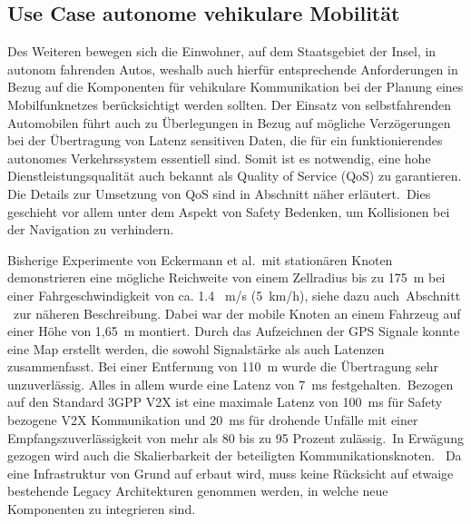 \subsection{Use Case autonome vehikulare Mobilität}
\label{subsec: Autonome Vehikel}
Des Weiteren bewegen sich die Einwohner, auf dem Staatsgebiet der Insel, in autonom fahrenden Autos, weshalb auch hierfür entsprechende Anforderungen in Bezug auf die Komponenten für vehikulare Kommunikation bei der Planung eines Mobilfunknetzes berücksichtigt werden sollten. Der Einsatz von selbstfahrenden Automobilen führt auch zu Überlegungen in Bezug auf mögliche Verzögerungen bei der Übertragung von Latenz sensitiven Daten, die für ein funktionierendes autonomes Verkehrssystem  essentiell sind. Somit ist es notwendig, eine hohe Dienstleistungsqualität auch bekannt als Quality of Service (QoS) zu garantieren. Die Details zur Umsetzung von QoS sind in Abschnitt  näher erläutert.\ Dies geschieht vor allem unter dem Aspekt von Safety Bedenken, um Kollisionen bei der Navigation zu verhindern.\ 

Bisherige Experimente von Eckermann et al.\ mit stationären  Knoten demonstrieren eine mögliche Reichweite von einem Zellradius bis zu 175~m bei einer Fahrgeschwindigkeit von ca. 1.4~ m/s (5~km/h), siehe dazu auch\ Abschnitt \ zur näheren Beschreibung. Dabei war der mobile Knoten an einem Fahrzeug auf einer Höhe von 1,65~m montiert. Durch das Aufzeichnen der GPS Signale konnte eine Map erstellt werden, die sowohl Signalstärke als auch Latenzen zusammenfasst. Bei einer Entfernung von 110~m wurde die Übertragung sehr unzuverlässig. Alles in allem wurde eine Latenz von 7~ms festgehalten.\ Bezogen auf den Standard 3GPP V2X ist eine maximale Latenz von 100~ms für Safety bezogene V2X Kommunikation und 20~ms für drohende Unfälle mit einer Empfangszuverlässigkeit von mehr als 80 bis zu 95 Prozent zulässig.\ In Erwägung gezogen wird auch die Skalierbarkeit der beteiligten Kommunikationsknoten.\ \cite{eckermann2018tinylte} Da eine Infrastruktur von Grund auf erbaut wird, muss keine Rücksicht auf etwaige bestehende Legacy Architekturen genommen werden, in welche neue Komponenten zu integrieren sind. 

